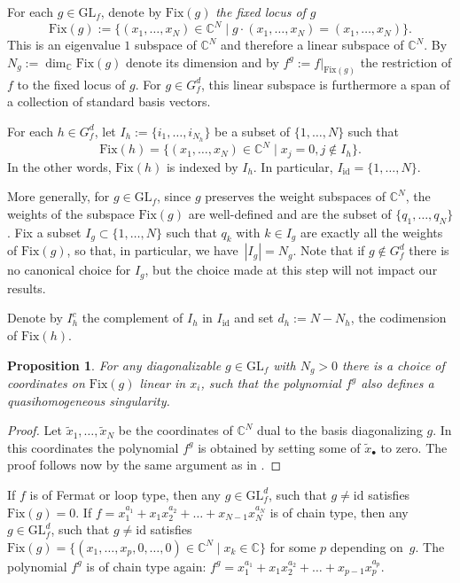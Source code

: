 \documentclass[10pt,a4paper]{article}
\numberwithin{equation}{section}
\newtheorem{Proposition}[Theorem]{Proposition}
 { \theoremstyle{definition}
\newtheorem{Definition}[Theorem]{Definition}
\newtheorem{Note}[Theorem]{Note}
\newtheorem{Example}[Theorem]{Example}
\newtheorem{Remark}[Theorem]{Remark} }
\newcommand{\CC}{{\mathbb{C}}}
\newcommand{\GL}{{\mathrm{GL}}}
\newcommand{\Fix}{\mathrm{Fix}}
\newcommand{\id}{\mathrm{id}}
\begin{document}
For each $g\in \GL_f$, denote by $\Fix(g)$ \textit{the fixed locus of $g$}
\begin{equation*}
 	\Fix(g):=\bigl\lbrace (x_1,\dots,x_N) \in\CC^N \mid g \cdot (x_1,\dots,x_N) = (x_1,\dots,x_N) \bigr\rbrace.
\end{equation*}
This is an eigenvalue $1$ subspace of $\CC^N$ and therefore a linear subspace of $\CC^N$.
By $N_g:=\dim_\CC\Fix(g)$ denote its dimension and by $f^g:=f|_{\Fix(g)}$ the restriction of $f$ to the fixed locus of $g$.
For $g\in G_f^d$, this linear subspace is furthermore a span of a collection of standard basis vectors.

For each $h\in G_f^d$, let $I_h := \{i_1,\dots,i_{N_h}\}$ be a subset of $\{1,\dots, N\}$ such that
\[
\Fix(h)=\bigl\{(x_1,\dots,x_N)\in\CC^N\mid x_{j}=0, j\notin I_h\bigr\}.
\]
In the other words, $\Fix(h)$ is indexed by $I_h$.
In particular, $I_{\id}=\{1,\dots, N\}$.

More generally, for $g\in \GL_f$, since $g$ preserves the weight subspaces of $\CC^N$, the weights of the subspace $\Fix(g)$ are well-defined and are the subset of $\{q_1,\ldots,q_N\}$. Fix a subset ${I_g\subset \{1,\ldots,N\}}$ such that $q_k$ with $k\in I_g$ are exactly all the weights of $\Fix(g)$, so that, in particular, we have~${|I_g|=N_g}$. Note that if $g\not\in G_f^d$ there is no canonical choice for $I_g$, but the choice made at this step will not impact our results.

Denote by $I_h^c$ the complement of $I_h$ in $I_\id$ and set $d_h:=N-N_h$, the codimension of $\Fix(h)$.

\begin{Proposition}
	For any diagonalizable $g \in \GL_f$ with $N_g > 0$ there is a choice of coordinates on $\Fix(g)$ linear in $x_i$, such that the polynomial $f^g$ also defines a quasihomogeneous singularity.
\end{Proposition}
\begin{proof}
	Let $\widetilde x_1,\dots, \widetilde x_N$ be the coordinates of $\CC^N$ dual to the basis diagonalizing $g$. In this coordinates the polynomial $f^g$ is obtained by setting some of $\widetilde x_\bullet$ to zero. The proof follows now by the same argument as in \cite[Proposition~5]{ET13}.
\end{proof}

\begin{Example}
If $f$ is of Fermat or loop type, then any $g \in \GL_f^d$, such that $g \neq \id$ satisfies $\Fix(g) = 0$.
If $f = x_1^{a_1} + x_1x_2^{a_2} + \dots +x_{N-1}x_N^{a_N}$ is of chain type, then any $g \in \GL_f^d$, such that $g \neq \id$ satisfies
$\Fix(g) = \bigl\lbrace (x_1,\dots,x_p,0,\dots,0) \in \CC^N \mid x_k \in \CC \bigr\rbrace$ for some $p$ depending on~$g$.
The polynomial $f^g$ is of chain type again: $f^g = x_1^{a_1} + x_1x_2^{a_2} + \dots +x_{p-1}x_p^{a_p}$.
\end{Example}
\end{document}

